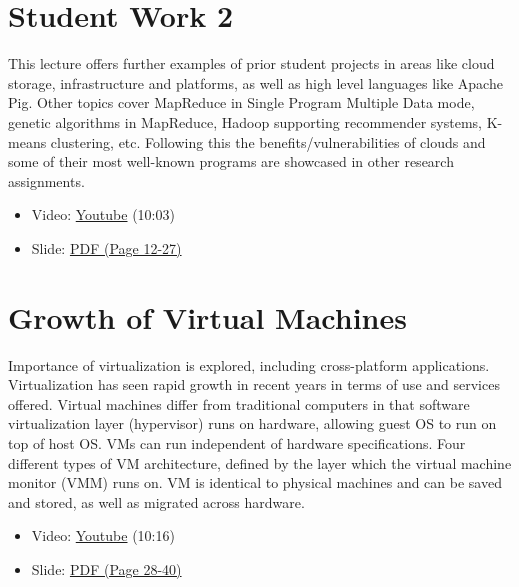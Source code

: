\section{Student Work 2}\label{student-work-2}

This lecture offers further examples of prior student projects in areas
like cloud storage, infrastructure and platforms, as well as high level
languages like Apache Pig. Other topics cover MapReduce in Single
Program Multiple Data mode, genetic algorithms in MapReduce, Hadoop
supporting recommender systems, K-means clustering, etc. Following this
the benefits/vulnerabilities of clouds and some of their most well-known
programs are showcased in other research assignments.

\begin{itemize}

\item
  Video: \href{https://www.youtube.com/watch?v=DqaQ0kemmaw}{Youtube}
  (10:03)
\end{itemize}

\begin{itemize}

\item
  Slide:
  \href{https://drive.google.com/open?id=0B88HKpainTSfQU1uQmxZWHdWQ1k}{PDF
  (Page 12-27)}
\end{itemize}

\section{Growth of Virtual
Machines}\label{growth-of-virtual-machines}

Importance of virtualization is explored, including cross-platform
applications. Virtualization has seen rapid growth in recent years in
terms of use and services offered. Virtual machines differ from
traditional computers in that software virtualization layer (hypervisor)
runs on hardware, allowing guest OS to run on top of host OS. VMs can
run independent of hardware specifications. Four different types of VM
architecture, defined by the layer which the virtual machine monitor
(VMM) runs on. VM is identical to physical machines and can be saved and
stored, as well as migrated across hardware.

\begin{itemize}

\item
  Video: \href{https://www.youtube.com/watch?v=5oKoAPCXLws}{Youtube}
  (10:16)
\item
  Slide:
  \href{https://drive.google.com/open?id=0B88HKpainTSfQU1uQmxZWHdWQ1k}{PDF
  (Page 28-40)}
\end{itemize}

